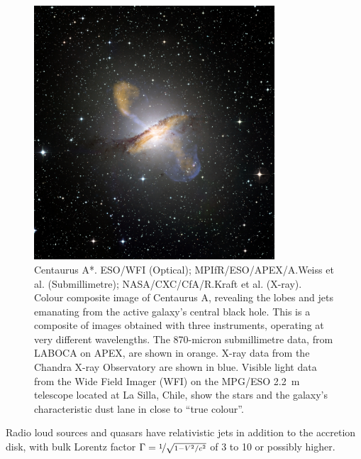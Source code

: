\documentclass[10pt,a4paper,english]{article}
\begin{document}
\begin{figure}[!ht]
    \noindent
    \begin{minipage}{.6\textwidth}
        \centering
        \includegraphics[width=0.8\textwidth]{eso0903a.jpg}
    \end{minipage}%
    \hfill
    \begin{minipage}{.4\textwidth}
        \caption{
            Centaurus A*. ESO/WFI (Optical); MPIfR/ESO/APEX/A.Weiss et al.
            (Submillimetre); NASA/CXC/CfA/R.Kraft et al. (X-ray).\vspace{1ex}\\
            Colour composite image of Centaurus A, revealing the lobes and jets
            emanating from the active galaxy’s central black hole. This is a
            composite of images obtained with three instruments, operating at
            very different wavelengths. The 870-micron submillimetre data, from
            LABOCA on APEX, are shown in orange. X-ray data from the Chandra
            X-ray Observatory are shown in blue. Visible light data from the
            Wide Field Imager (WFI) on the MPG/ESO \SI{2.2}{\m} telescope
            located at La Silla, Chile, show the stars and the galaxy’s
            characteristic dust lane in close to “true colour”.
        }
    \end{minipage}
\end{figure}

Radio loud sources and quasars have relativistic jets in addition to the
accretion disk, with bulk Lorentz factor $\Gamma=\nicefrac{1}{\sqrt{1-V^2/c^2}}$
of 3 to 10 or possibly higher.
\end{document}
